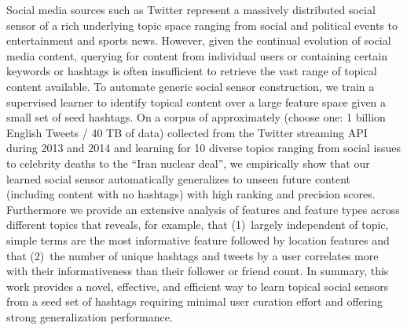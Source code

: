 Social media sources such as Twitter represent a massively distributed
social sensor of a rich underlying topic space ranging from social and
political events to entertainment and sports news.  However, given the
continual evolution of social media content, querying for content from
individual users or containing certain keywords or hashtags is often
insufficient to retrieve the vast range of topical content available.
To automate generic social sensor construction, we
train a supervised learner to identify topical content over a large
feature space given a small set of seed hashtags.  On a corpus of
approximately (choose one: 1 billion English Tweets / 40 TB of data)
collected from the Twitter streaming API during 2013 and 2014 and
learning for 10 diverse topics ranging from social issues to celebrity
deaths to the ``Iran nuclear deal'', we empirically show that our
learned social sensor automatically generalizes to unseen future
content (including content with no hashtags) with high ranking and
precision scores.  Furthermore we provide an extensive analysis of
features and feature types across different topics that reveals, for
example, that (1)~largely independent of topic, simple terms are the
most informative feature followed by location features and that
(2)~the number of unique hashtags and tweets by a user correlates more
with their informativeness than their follower or friend count.  In
summary, this work provides a novel, effective, and efficient way to
learn topical social sensors from a seed set of hashtags requiring
minimal user curation effort and offering strong generalization
performance.

